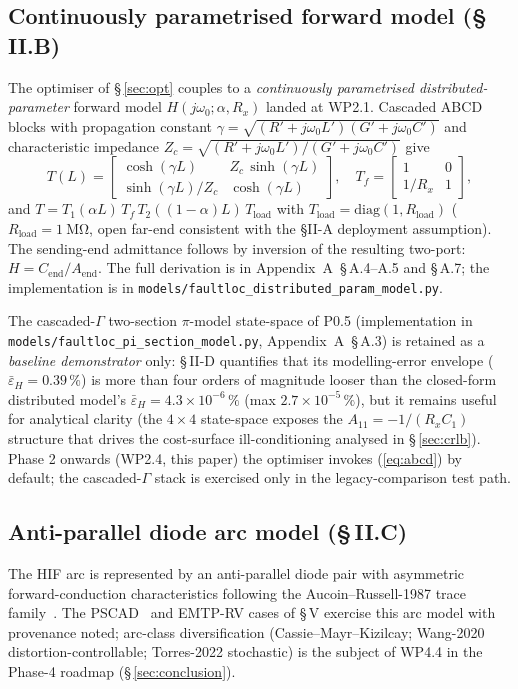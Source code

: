 \documentclass[journal]{IEEEtran}
\newcommand{\headlineKThreeAcc}%
  {$\bar{\varepsilon}_H = 4.3\!\times\!10^{-6}\,\%$
   (max $2.7\!\times\!10^{-5}\,\%$)}
\begin{document}
\subsection{Continuously parametrised forward model (\S\,II.B)}
\label{sec:fwdmodel}
The optimiser of \S\,\ref{sec:opt} couples to a
\emph{continuously parametrised distributed-parameter} forward model
$H(j\omega_0;\alpha,R_x)$ landed at WP2.1.  Cascaded ABCD blocks
with propagation constant $\gamma = \sqrt{(R'+j\omega_0 L')(G' +
j\omega_0 C')}$ and characteristic impedance
$Z_c = \sqrt{(R'+j\omega_0 L')/(G' + j\omega_0 C')}$ give
\begin{equation}
\!\!T(L) = \begin{bmatrix}
   \cosh(\gamma L) & Z_c\,\sinh(\gamma L)\\
   \sinh(\gamma L)/Z_c & \cosh(\gamma L)
\end{bmatrix},\quad
T_f = \begin{bmatrix}1 & 0\\ 1/R_x & 1\end{bmatrix},
\label{eq:abcd}
\end{equation}
and
$T = T_1(\alpha L)\,T_f\,T_2((1-\alpha)L)\,T_{\text{load}}$ with
$T_{\text{load}} = \mathrm{diag}(1, R_{\text{load}})$ ($R_{\text{load}}
= \SI{1}{\mega\ohm}$, open far-end consistent with the §II-A
deployment assumption).  The sending-end admittance follows by
inversion of the resulting two-port:
$H = C_{\text{end}}/A_{\text{end}}$.  The full derivation is in
Appendix~A~\S\,A.4--A.5 and \S\,A.7; the implementation is in
\texttt{models/faultloc\_distributed\_param\_model.py}.

The cascaded-$\Gamma$ two-section $\pi$-model state-space of P0.5
(implementation in \texttt{models/faultloc\_pi\_section\_model.py},
Appendix~A~\S\,A.3) is retained as a \emph{baseline demonstrator}
only: \S\,II-D quantifies that its modelling-error envelope
($\bar{\varepsilon}_H = 0.39\,\%$) is more than four orders of
magnitude looser than the closed-form distributed model's
\headlineKThreeAcc{}, but it remains useful for analytical
clarity (the $4\!\times\!4$ state-space exposes the
$A_{11} = -1/(R_x C_1)$ structure that drives the cost-surface
ill-conditioning analysed in \S\,\ref{sec:crlb}).  Phase 2 onwards
(WP2.4, this paper) the optimiser invokes (\ref{eq:abcd}) by default;
the cascaded-$\Gamma$ stack is exercised only in the legacy-comparison
test path.

\subsection{Anti-parallel diode arc model (\S\,II.C)}
\label{sec:arcmodel}
The HIF arc is represented by an anti-parallel diode pair with
asymmetric forward-conduction characteristics following the
Aucoin--Russell-1987 trace family~\cite{AucoinRussell1987TPWRD}.  The
PSCAD~\cite{Penaloza2023EPSR} and EMTP-RV cases of \S\,V exercise
this arc model with provenance noted; arc-class diversification
(Cassie--Mayr--Kizilcay; Wang-2020 distortion-controllable;
Torres-2022 stochastic) is the subject of WP4.4 in the Phase-4
roadmap (\S\,\ref{sec:conclusion}).
\end{document}
